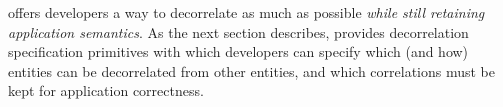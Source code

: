 \sys offers developers a way to decorrelate as much as possible \emph{while still retaining
application semantics}. As the next section describes, \sys provides decorrelation specification
primitives with which developers can specify which (and how) entities can be decorrelated from other
entities, and which correlations must be kept for application correctness.

